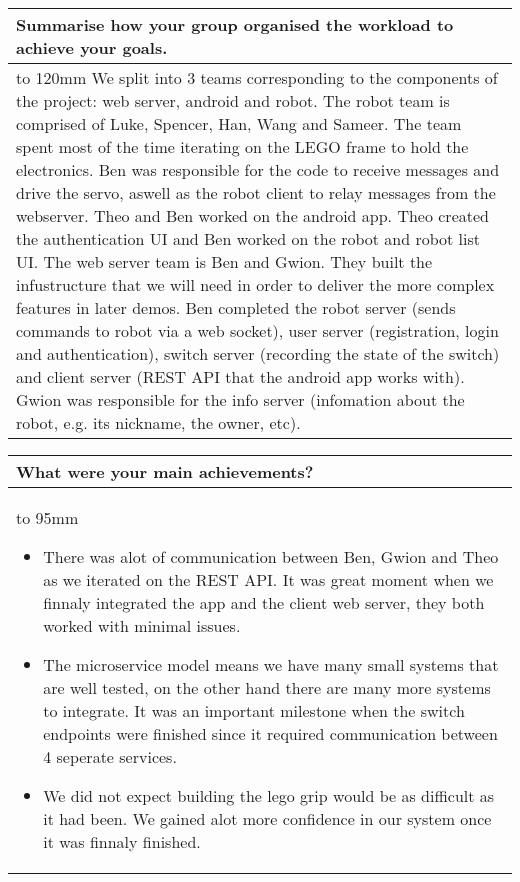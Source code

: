 \documentclass[a4paper]{article}
\newcommand{\colWidth}{141mm}
\begin{document}
\begin{center}

\begin{tabular}{|p{\colWidth}|}
	\hline
	\cellcolor{blue!25}\large
	\textbf{Summarise how your group organised the workload to achieve your goals.}
	\\ \hline
	\vtop to 120mm{
		We split into 3 teams corresponding to the components of the project: web server, android and robot.
		\newline\newline
		The robot team is comprised of Luke, Spencer, Han, Wang and Sameer. The team spent most of the time iterating on the LEGO frame to hold the electronics. Ben was responsible for the code to receive messages and drive the servo, aswell as the robot client to relay messages from the webserver.
		\newline\newline
		Theo and Ben worked on the android app. Theo created the authentication UI and Ben worked on the robot and robot list UI.
		\newline\newline
		The web server team is Ben and Gwion. They built the infustructure that we will need in order to deliver the more complex features in later demos. Ben completed the robot server (sends commands to robot via a web socket), user server (registration, login and authentication), switch server (recording the state of the switch) and client server (REST API that the android app works with). Gwion was responsible for the info server (infomation about the robot, e.g. its nickname, the owner, etc).
	}
  \\
  \hline
\end{tabular}
\vskip 5mm


\begin{tabular}{|p{\colWidth}|}
	\hline
	\cellcolor{blue!25}\large
	\textbf{What were your main achievements?}
	\\ \hline
	\vtop to 95mm{
		\begin{itemize}
			\item There was alot of communication between Ben, Gwion and Theo as we iterated on the REST API. It was great moment when we finnaly integrated the app and the client web server, they both worked with minimal issues.
			\item The microservice model means we have many small systems that are well tested, on the other hand there are many more systems to integrate. It was an important milestone when the switch endpoints were finished since it required communication between 4 seperate services.
			\item We did not expect building the lego grip would be as difficult as it had been. We gained alot more confidence in our system once it was finnaly finished.
		\end{itemize}
	}
  \\
  \hline
\end{tabular}
\vskip 5mm


\end{center}
\end{document}
